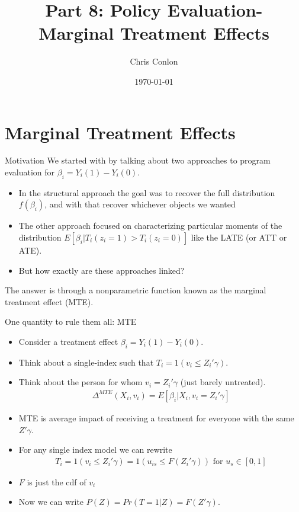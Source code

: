 \documentclass[xcolor=pdftex,dvipsnames,table,mathserif,aspectratio=169]{beamer}
\begin{document}
\title{Part 8: Policy Evaluation- Marginal Treatment Effects}
\author{Chris Conlon}
\date{\today}

\maketitle
\section{Marginal Treatment Effects}


\begin{frame}{Motivation}
We started with by talking about two approaches to program evaluation for $\beta_i = Y_i(1) - Y_i(0)$.
\begin{itemize}
\item In the \alert{structural approach} the goal was to recover the full distribution $f(\beta_i)$, and with that recover whichever objects we wanted
\item The other approach focused on characterizing particular moments of the distribution $E[ \beta_i | T_{i}(z_i=1) > T_{i}(z_i = 0)]$ like the LATE (or ATT or ATE).
\item But how exactly are these approaches linked?
\end{itemize}
The answer is through a \alert{nonparametric function} known as the \alert{marginal treatment effect} (MTE).
\end{frame}




\begin{frame}{One quantity to rule them all: MTE}
\begin{itemize}
\item Consider a treatment effect $\beta_i = Y_{i}(1) - Y_{i}(0)$.
\item Think about a single-index such that $T_i = 1(v_i \leq Z_i' \gamma)$.
\item Think about the person for whom $v_i = Z_i'\gamma$ (just barely untreated).
\begin{eqnarray*}
\Delta^{MTE}(X_i, v_i) = E[\beta_i | X_i, v_i = Z_i'\gamma] 
\end{eqnarray*}
\item MTE is average impact of receiving a treatment for everyone with the same $Z' \gamma$.
\item For any single index model we can rewrite 
\begin{eqnarray*}
T_i = 1(v_i \leq Z_i' \gamma) = 1(u_{is} \leq F(Z_i' \gamma)) \mbox{ for }  u_s \in [0,1]
\end{eqnarray*}
\item $F$ is just the cdf of $v_i$
\item Now we can write $P(Z) = Pr(T=1|Z )= F(Z'\gamma)$.
\end{itemize}
\end{frame}
\end{document}
